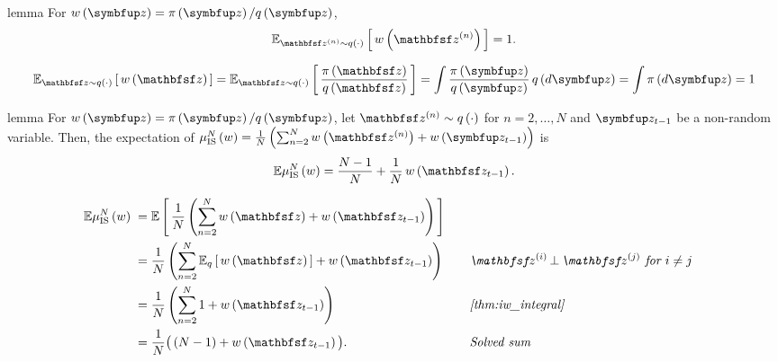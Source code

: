 
\begin{theoremEnd}{lemma}\label{thm:iw_integral}
  For \(w\left(\vz\right) = \pi\left(\vz\right)/q\left(\vz\right)\),
  \begin{align*}
    \Esub{\rvvz^{(n)} \sim q\left(\cdot\right)}{
      w\left(\rvvz^{(n)}\right) 
    }
    = 1.
  \end{align*}
\end{theoremEnd}
\begin{proofEnd}
  \begin{align*}
    \Esub{\rvvz \sim q\left(\cdot\right)}{
      w\left(\rvvz\right) 
    }
    =
    \Esub{\rvvz \sim q\left(\cdot\right)}{
      \frac{\pi\left(\rvvz\right)}{q\left(\rvvz\right)}
    }
    = 
    \int 
    \frac{\pi\left(\vz\right)}{q\left(\vz\right)}
    \, q\left(d\vz\right)
    = 
    \int 
    \pi\left(d\vz\right)
    =
    1
  \end{align*}
\end{proofEnd}

\begin{theoremEnd}{lemma}\label{thm:iw_bound}
  For \(w\left(\vz\right) = \pi\left(\vz\right)/q\left(\vz\right)\), let \(\rvvz^{(n)} \sim q\left(\cdot\right)\) for \(n=2, \ldots, N\) and \(\vz_{t-1}\) be a non-random variable.
  Then, the expectation of \( \mu_{\mathrm{IS}}^N\left(w\right) = \frac{1}{N}\left(\sum^N_{n=2} w\left(\rvvz^{(n)}\right) + w\left(\vz_{t-1}\right) \right)\) is 
  \begin{align*}
    \mathbb{E}{
      \mu_{\mathrm{IS}}^N\left(w\right)
    }
    = \frac{N-1}{N} + \frac{1}{N} \, w\left(\rvvz_{t-1}\right).
  \end{align*}
\end{theoremEnd}
\begin{proofEnd}
  \begin{alignat}{2}
    \mathbb{E}{
      \mu_{\mathrm{IS}}^N\left(w\right)
    }
    &\;=
    \E{
      \frac{1}{N} \left( \sum^N_{n=2}
        w\left(\rvvz\right) 
        + w\left(\rvvz_{t-1}\right) \right)
    }
    \nonumber
    \\
    &\;=
    \frac{1}{N} \left( \sum^N_{n=2}  \Esub{q}{
      w\left(\rvvz\right) 
    }
    + w\left(\rvvz_{t-1}\right) \right)
    &&\quad\text{\textit{\(\rvvz^{(i)} \,\bot\, \rvvz^{(j)}\) for \(i \neq j\)}}
    \nonumber
    \\
    &\;=
    \frac{1}{N}
    \left(
    \sum^N_{n=2} 1
    + w\left(\rvvz_{t-1}\right) 
    \right)
    \nonumber
    &&\quad\text{\textit{\cref{thm:iw_integral}}}
    \\
    &\;=
    \frac{1}{N}
    \big(
    \left(N-1\right) + w\left(\rvvz_{t-1}\right) 
    \big).
    \nonumber
    &&\quad\text{\textit{Solved sum}}
  \end{alignat}
\end{proofEnd}

